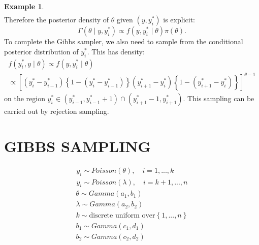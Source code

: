 \documentclass[lecture,12pt,]{pcms-l}
\numberwithin{section}{chapter}
\numberwithin{equation}{chapter}
\theoremstyle{plain}
\theoremstyle{definition}
\newtheorem{example}{Example}[section]
\theoremstyle{definition}
\begin{document}
\begin{example}
\begin{equation}
\begin{split}
\end{split}
\end{equation}
Therefore the posterior density of $\theta$ given $(y,y_{i}^*)$ is explicit:
\begin{equation}
\Gamma(\theta \mid y,y_{i}^*) \propto f(y,y_{i}^* \mid \theta) \pi(\theta).
\end{equation}
To complete the Gibbs sampler, we also need to sample from the conditional posterior distribution of $y_{i}^*$. This has density:
\begin{equation}
\begin{split}
f(y_{i}^*,y \mid \theta) \propto f(y,y_{i}^* \mid \theta) 
\\
\propto \left [ (y_{i}^*-y_{i-1}^*)\left \{  1- (y_{i}^*-y_{i-1}^*) \right \} (y_{i+1}^*-y_{i}^*)\left \{  1- (y_{i+1}^*-y_{i}^*) \right \}\right ]^{\theta-1}
\end{split}
\end{equation}
on the region $y_{i}^* \in (y_{i-1}^*,y_{i-1}^*+1)\cap (y_{i+1}^*-1,y_{i+1}^*) $. This sampling can be carried out by rejection sampling.
\end{example}


\appendix

\chapter*{GIBBS SAMPLING}
\begin{equation*}
\begin{split}
y_i \sim Poisson(\theta), \quad i=1,...,k
\\
y_i \sim Poisson(\lambda), \quad i=k+1,...,n
\end{split}
\end{equation*}
\begin{equation*}
\begin{split}
\theta \sim Gamma(a_1,b_1)
\\
\lambda \sim Gamma(a_2,b_2)
\\
k \sim \text{discrete uniform over}\left \{1,...,n  \right \}
\\
b_1 \sim Gamma(c_1,d_1)
\\
b_2 \sim Gamma(c_2,d_2)
\end{split}
\end{equation*}
\end{document}
